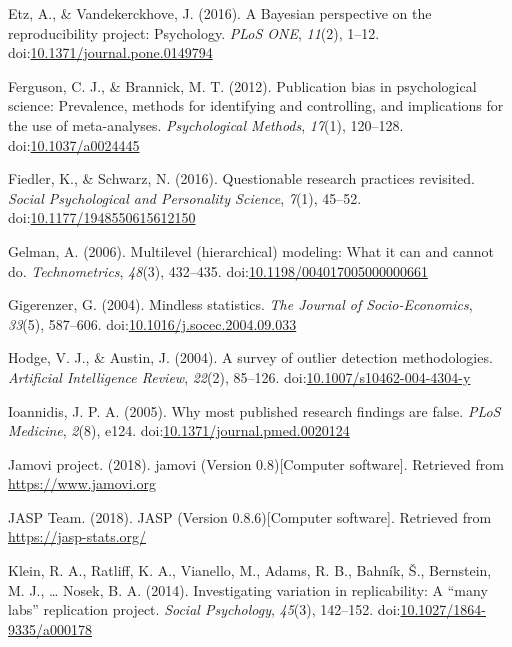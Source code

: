 \documentclass[english,,man,mask]{apa6}
\theoremstyle{definition}
\theoremstyle{definition}
\theoremstyle{definition}
\theoremstyle{remark}
\begin{document}
\hypertarget{ref-Etz2016}{}
Etz, A., \& Vandekerckhove, J. (2016). A Bayesian perspective on the
reproducibility project: Psychology. \emph{PLoS ONE}, \emph{11}(2),
1--12.
doi:\href{https://doi.org/10.1371/journal.pone.0149794}{10.1371/journal.pone.0149794}

\hypertarget{ref-Ferguson2012a}{}
Ferguson, C. J., \& Brannick, M. T. (2012). Publication bias in
psychological science: Prevalence, methods for identifying and
controlling, and implications for the use of meta-analyses.
\emph{Psychological Methods}, \emph{17}(1), 120--128.
doi:\href{https://doi.org/10.1037/a0024445}{10.1037/a0024445}

\hypertarget{ref-Fiedler2016}{}
Fiedler, K., \& Schwarz, N. (2016). Questionable research practices
revisited. \emph{Social Psychological and Personality Science},
\emph{7}(1), 45--52.
doi:\href{https://doi.org/10.1177/1948550615612150}{10.1177/1948550615612150}

\hypertarget{ref-Gelman2006}{}
Gelman, A. (2006). Multilevel (hierarchical) modeling: What it can and
cannot do. \emph{Technometrics}, \emph{48}(3), 432--435.
doi:\href{https://doi.org/10.1198/004017005000000661}{10.1198/004017005000000661}

\hypertarget{ref-Gigerenzer2004}{}
Gigerenzer, G. (2004). Mindless statistics. \emph{The Journal of
Socio-Economics}, \emph{33}(5), 587--606.
doi:\href{https://doi.org/10.1016/j.socec.2004.09.033}{10.1016/j.socec.2004.09.033}

\hypertarget{ref-Hodge2004}{}
Hodge, V. J., \& Austin, J. (2004). A survey of outlier detection
methodologies. \emph{Artificial Intelligence Review}, \emph{22}(2),
85--126.
doi:\href{https://doi.org/10.1007/s10462-004-4304-y}{10.1007/s10462-004-4304-y}

\hypertarget{ref-Ioannidis2005}{}
Ioannidis, J. P. A. (2005). Why most published research findings are
false. \emph{PLoS Medicine}, \emph{2}(8), e124.
doi:\href{https://doi.org/10.1371/journal.pmed.0020124}{10.1371/journal.pmed.0020124}

\hypertarget{ref-jamovi2018}{}
Jamovi project. (2018). jamovi (Version 0.8){[}Computer software{]}.
Retrieved from \url{https://www.jamovi.org}

\hypertarget{ref-JASP2018}{}
JASP Team. (2018). JASP (Version 0.8.6){[}Computer software{]}.
Retrieved from \url{https://jasp-stats.org/}

\hypertarget{ref-Klein2014c}{}
Klein, R. A., Ratliff, K. A., Vianello, M., Adams, R. B., Bahník, Š.,
Bernstein, M. J., \ldots{} Nosek, B. A. (2014). Investigating variation
in replicability: A ``many labs'' replication project. \emph{Social
Psychology}, \emph{45}(3), 142--152.
doi:\href{https://doi.org/10.1027/1864-9335/a000178}{10.1027/1864-9335/a000178}
\end{document}
